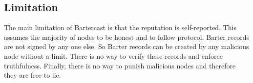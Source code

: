 \subsection{Limitation}
The main limitation of Bartercast is that the reputation is self-reported.
This assumes the majority of nodes to be honest and to follow protocol.
Barter records are not signed by any one else.
So Barter records can be created by any malicious node without a limit.
There is no way to verify these records and enforce truthfulness.
Finally, there is no way to punish malicious nodes and therefore they are free to lie.



